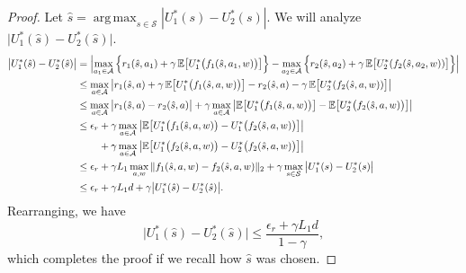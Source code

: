 \documentclass[11pt, notitlepage]{article}
\DeclareMathOperator*{\argmax}{arg\,max}
\newcommand{\E}{\mathbb{E}}
\newcommand{\1}{\mathbbm{1}}
\begin{document}
\begin{proof}
    Let $\hat{s} = \argmax_{s\in\mathcal{S}} | U_1^*(s)-U_2^*(s)|$. We will analyze $\bigl| U_1^*(\hat{s})-U_2^*(\hat{s}) \bigr|$. 
    \begin{align*}
        \bigl| U_1^*(\hat{s}) - U_2^*(\hat{s}) \bigr| &= \Bigl| \max_{a_1\in\mathcal{A}} \, \Bigl \{ r_1(\hat{s},a_1) + \gamma\, \E \bigl [U_1^* \bigl( f_1(\hat{s},a_1,w) \bigr) \bigr] \Bigr\} - \max_{a_2\in\mathcal{A}} \, \Bigl\{ r_2(\hat{s},a_2) + \gamma \, \E \bigl [U_2^*(f_2(\hat{s},a_2,w)) \bigr] \Bigr \} \Bigr|\\
        &\leq \max_{a\in\mathcal{A}} \,  \bigl| r_1(\hat{s},a) + \gamma\, \E \bigl [U_1^* \bigl( f_1(\hat{s},a,w) \bigr) \bigr] - r_2(\hat{s},a) - \gamma \, \E \bigl [U_2^*(f_2(\hat{s},a,w)) \bigr] \bigr| \\
        &\leq \max_{a\in\mathcal{A}} \, \bigl| r_1(\hat{s},a) - r_2(\hat{s},a)\bigr| + \gamma \max_{a\in\mathcal{A}}  \, \bigl|\E \bigl [U_1^* \bigl( f_1(\hat{s},a,w) \bigr) \bigr] - \E \bigl [U_2^* \bigl( f_2(\hat{s},a,w) \bigr) \bigr]\bigr| \\
        &\leq \begin{aligned}[t]\epsilon_r &+ \gamma \max_{a\in\mathcal{A}}  \, \bigl|\E \bigl [U_1^* \bigl( f_1(\hat{s},a,w) \bigr) - U_1^* \bigl( f_2(\hat{s},a,w) \bigr) \bigr]\bigr|\\
                                &+ \gamma \max_{a\in\mathcal{A}}  \, \bigl|\E \bigl [U_1^* \bigl( f_2(\hat{s},a,w) \bigr) - U_2^* \bigl( f_2(\hat{s},a,w) \bigr) \bigr]\bigr|\end{aligned} \\
        &\leq \epsilon_r + \gamma L_1 \max_{a, w}  \|f_1(\hat{s},a,w) - f_2(\hat{s},a,w)\|_2 + \gamma \max_{s\in\mathcal{S}} \, \bigl|U_1^*(s)-U_2^*(s)\bigr| \\
        &\leq \epsilon_r + \gamma L_1 d + \gamma \bigl|U_1^*(\hat{s})-U_2^*(\hat{s})\bigr|.
    \end{align*}
    Rearranging, we have
    \begin{equation*}
        \bigl| U_1^*(\hat{s})-U_2^*(\hat{s}) \bigr| \leq \frac{\epsilon_r + \gamma L_1 d}{1-\gamma},
    \end{equation*}
    which completes the proof if we recall how $\hat{s}$ was chosen.
\end{proof}
\end{document}
